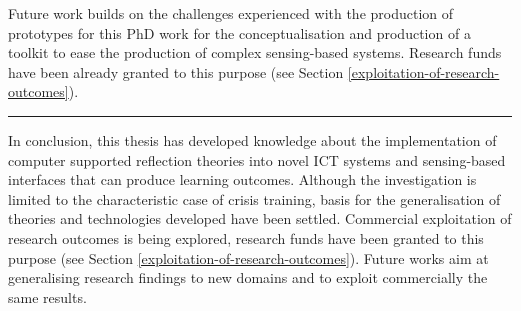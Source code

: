 Future work builds on the challenges experienced with the production of
prototypes for this PhD work for the conceptualisation and production of
a toolkit to ease the production of complex sensing-based systems.
Research funds have been already granted to this purpose (see Section
\ref{exploitation-of-research-outcomes}).

\rule{\textwidth}{.1pt}

\bigskip

In conclusion, this thesis has developed knowledge about the
implementation of computer supported reflection theories into novel ICT
systems and sensing-based interfaces that can produce learning outcomes.
Although the investigation is limited to the characteristic case of
crisis training, basis for the generalisation of theories and
technologies developed have been settled. Commercial exploitation of
research outcomes is being explored, research funds have been granted to
this purpose (see Section \ref{exploitation-of-research-outcomes}).
Future works aim at generalising research findings to new domains and to
exploit commercially the same results.
